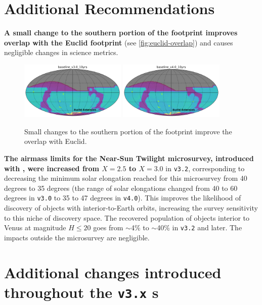 \section{Additional Recommendations}\label{sec:additional}

{\bf A small change to the southern portion of the footprint improves overlap with the Euclid footprint} (see \autoref{fig:euclid-overlap}) and causes negligible changes in science metrics. 
\begin{figure}
\centering
\includegraphics[width=0.45\textwidth]{figures/baseline_v3_0_10yrs_euclid_overlap.png}
\includegraphics[width=0.45\textwidth]{figures/baseline_v4_0_10yrs_euclid_overlap.png}

\caption{Small changes to the southern portion of the footprint improve the overlap with Euclid. \label{fig:euclid-overlap}}
\end{figure}

{\bf The airmass limits for the Near-Sun Twilight microsurvey, introduced with , were increased from $X=2.5$ to $X=3.0$} in \texttt{v3.2}, corresponding to decreasing the minimum solar elongation reached for this microsurvey from 40 degrees to 35 degrees (the range of solar elongations changed from 40 to 60 degrees in \texttt{v3.0} to 35 to 47 degrees in \texttt{v4.0}). This improves the likelihood of discovery of objects with interior-to-Earth orbits, increasing the survey sensitivity to this niche of discovery space. The recovered population of objects
interior to Venus at magnitude $H\leq20$ goes from \mbox{$\sim$4\%} to \mbox{$\sim$40\%} in \texttt{v3.2} and later. The impacts outside the microsurvey are negligible.

\clearpage

\section{Additional changes introduced throughout the \texttt{v3.x} \opsim s } \label{sec:opsimchanges}

